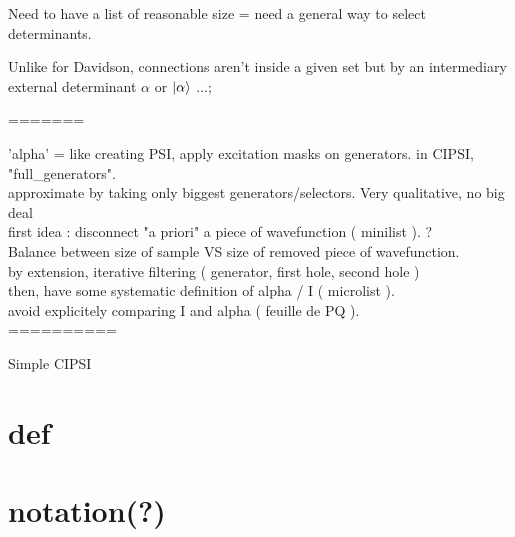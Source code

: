 \documentclass[./thesis.tex]{subfiles}
\begin{document}
\label{chap:CIPSI}

Need to have a list of reasonable size = need a general way to select determinants. 

Unlike for Davidson, connections aren't inside a given set but by an intermediary external determinant $\alpha$ or $\ket \alpha$ ...; 

=======

'alpha' = like creating PSI, apply excitation masks on generators. in CIPSI, "full\_generators". \\
approximate by taking only biggest generators/selectors. Very qualitative, no big deal \\
first idea : disconnect "a priori" a piece of wavefunction ( minilist ). ?\\
Balance between size of sample VS size of removed piece of wavefunction. \\
by extension, iterative filtering ( generator, first hole, second hole ) \\
then, have some systematic definition of alpha / I ( microlist ). \\
avoid explicitely comparing I and alpha ( feuille de PQ ). \\

==========



\begin{algorithm}
	\caption{Simple CIPSI}
		\KwData{ $\Psi$ }
\end{algorithm}

\section{def}

\section{notation(?)}
\end{document}
